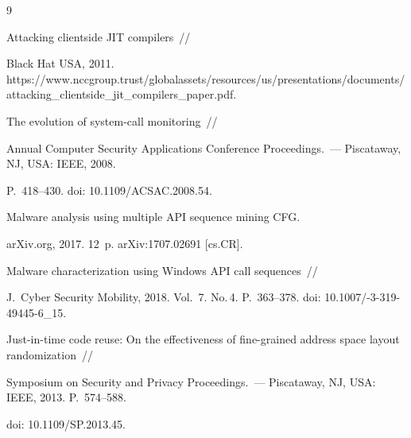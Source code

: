 {\small\frenchspacing

{%


\begin{thebibliography}{9}


 Attacking clientside JIT compilers~/\!\!/ 

Black Hat USA, 2011. {\sf https://www.nccgroup.trust/globalassets/resources/us/presentations/documents/\linebreak attacking\_clientside\_jit\_compilers\_paper.pdf}.






 The evolution of system-call monitoring~/\!\!/ 

Annual Computer Security Applications Conference Proceedings.~--- Piscataway, NJ, USA: IEEE, 2008. 

P.~418--430. doi: 10.1109\!/\!ACSAC.2008.54.








 Malware analysis using multiple API sequence mining CFG. 

arXiv.org, 2017. 12~p. arXiv:1707.02691 [cs.CR].




 Malware characterization using Windows API call sequences~/\!\!/ 

J.~Cyber Security Mobility, 2018. Vol.~7. No.\,4. P.~363--378. doi: 10.1007\!/-3-319-49445-6\_15.





Just-in-time code reuse: On the effectiveness of fine-grained address space layout randomization~/\!\!/ 

Symposium on Security and Privacy Proceedings.~--- Piscataway, NJ, USA: IEEE, 2013. P.~574--588. 

doi: 10.1109\!/\!SP.2013.45.




\end{thebibliography}}}
